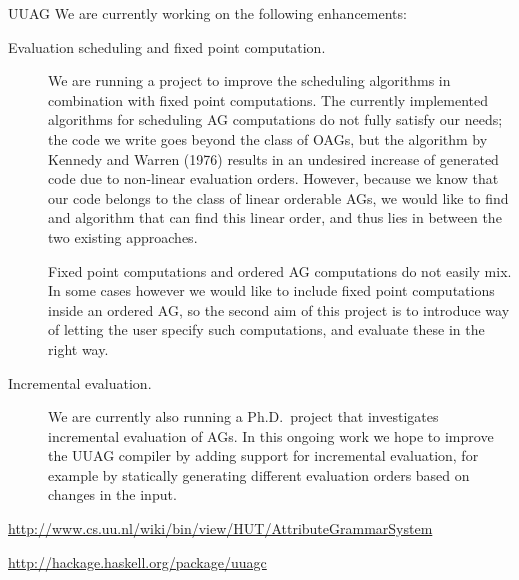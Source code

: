 \begin{hcarentry}[updated]{UUAG}
We are currently working on the following enhancements:
\begin{description}
\item[Evaluation scheduling and fixed point computation.]
  We are running a project to improve the scheduling algorithms in combination with fixed point computations. The currently implemented algorithms for scheduling AG computations do not fully satisfy our needs; the code we write goes beyond the class of OAGs, but the algorithm by Kennedy and Warren (1976) results in an undesired increase of generated code due to non-linear evaluation orders. However, because we know that our code belongs to the class of linear orderable AGs, we would like to find and algorithm that can find this linear order, and thus lies in between the two existing approaches.

Fixed point computations and ordered AG computations do not easily mix. In some cases however we would like to include fixed point computations inside an ordered AG, so the second aim of this project is to introduce way of letting the user specify such computations, and evaluate these in the right way.

\item[Incremental evaluation.]
  We are currently also running a Ph.D.\ project that investigates incremental evaluation of
  AGs. In this ongoing work we hope to improve the UUAG compiler by adding support for
  incremental evaluation, for example by statically generating different evaluation orders
  based on changes in the input.
\end{description}

\FurtherReading
\begin{compactitem}
\item
  \url{http://www.cs.uu.nl/wiki/bin/view/HUT/AttributeGrammarSystem}
\item
  \url{http://hackage.haskell.org/package/uuagc}
\end{compactitem}
\end{hcarentry}
